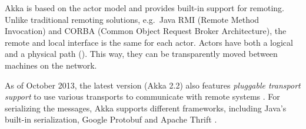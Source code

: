 
Akka is based on the actor model \cite{Hewitt:1973:UMA:1624775.1624804} and provides built-in support for remoting. Unlike traditional remoting solutions, e.g.\ Java RMI (Remote Method Invocation) and CORBA (Common Object Request Broker Architecture), the remote and local interface is the same for each actor. Actors have both a logical and a physical path (). This way, they can be transparently moved between machines on the network.

As of October 2013, the latest version (Akka 2.2) also features \textit{pluggable transport support} to use various transports to communicate with remote systems \cite{Akka}. For serializing the messages, Akka supports different frameworks, including Java's built-in serialization, Google Protobuf \cite{Protobuf} and Apache Thrift \cite{Thrift}.




% 
% 

